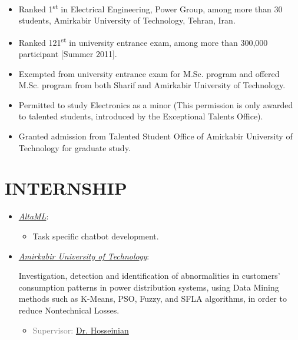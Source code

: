 \begin{itemize}
\item Ranked 1\textsuperscript{st} in Electrical Engineering, Power Group, among more than 30 students,
Amirkabir University of Technology, Tehran, Iran.

\item Ranked 121\textsuperscript{st} in university entrance exam, among more than 300,000
participant [Summer 2011].

\item Exempted from university entrance exam for M.Sc. program and offered M.Sc. program from both
Sharif and Amirkabir University of Technology.

\item Permitted to study Electronics as a minor (This permission is only awarded to talented students, introduced by the Exceptional Talents Office).

\item Granted admission from Talented Student Office of Amirkabir University of Technology for graduate study. \\
\end{itemize}

\vspace{-1 em}
\section{INTERNSHIP}
\begin{itemize}
	
\item \href{http://altaml.com/}{ \emph{AltaML}}:
\begin{itemize}
	\item Task specific chatbot development.
\end{itemize}

\item \href{http://aut.ac.ir/aut/}{ \emph{Amirkabir University of Technology}}:

Investigation, detection and identification of abnormalities in customers' consumption patterns in power distribution systems, using Data Mining methods such as K-Means, PSO, Fuzzy, and SFLA algorithms, in order to reduce Nontechnical Losses.
\begin{itemize} 
\item\textcolor{gray}{Supervisor: \href{http://www.aut.ac.ir/official/main.asp?uid=hosseinian}{Dr. Hosseinian}} 
\end{itemize}
\end{itemize}

